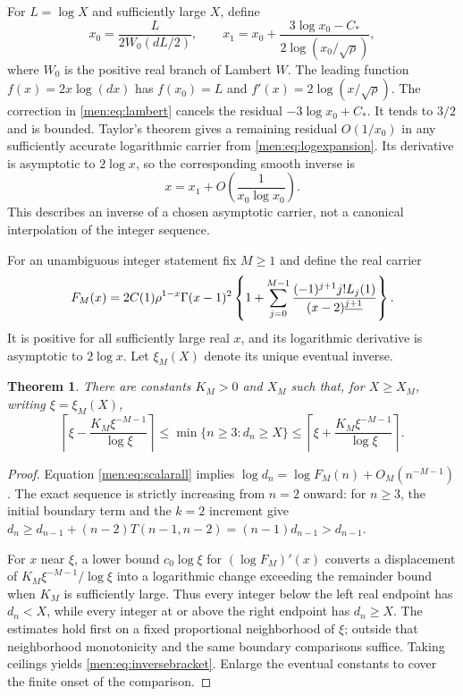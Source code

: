 \documentclass[11pt,letterpaper]{article}
\newtheorem{theorem}{Theorem}[section]
\theoremstyle{remark}\newtheorem{remark}[theorem]{Remark}
\begin{document}
For $L=\log X$ and sufficiently large $X$, define
\begin{equation}\label{men:eq:lambert}
 x_0=\frac{L}{2W_0(dL/2)},\qquad
 x_1=x_0+\frac{3\log x_0-C_*}{2\log(x_0/\sqrt\rho)},
\end{equation}
where $W_0$ is the positive real branch of Lambert $W$. The leading function $f(x)=2x\log(dx)$ has $f(x_0)=L$ and
$f'(x)=2\log(x/\sqrt\rho)$. The correction in \eqref{men:eq:lambert} cancels the residual $-3\log x_0+C_*$. It tends to $3/2$ and is bounded. Taylor's theorem gives a remaining residual $O(1/x_0)$ in any sufficiently accurate logarithmic carrier from \eqref{men:eq:logexpansion}. Its derivative is asymptotic to $2\log x$, so the corresponding smooth inverse is
\begin{equation}\label{men:eq:x1error}
 x=x_1+O\left(\frac1{x_0\log x_0}\right).
\end{equation}
This describes an inverse of a chosen asymptotic carrier, not a canonical interpolation of the integer sequence.

For an unambiguous integer statement fix $M\ge1$ and define the real carrier
\begin{equation}\label{men:eq:carrier}
 F_M(x)=2C(1)\rho^{1-x}\Gamma(x-1)^2
 \left\{1+\sum_{j=0}^{M-1}
  \frac{(-1)^{j+1}j!L_j(1)}{(x-2)^{\underline{j+1}}}\right\}.
\end{equation}
It is positive for all sufficiently large real $x$, and its logarithmic derivative is asymptotic to $2\log x$. Let $\xi_M(X)$ denote its unique eventual inverse.

\begin{theorem}\label{men:thm:inverse}
There are constants $K_M>0$ and $X_M$ such that, for $X\ge X_M$, writing $\xi=\xi_M(X)$,
\begin{equation}\label{men:eq:inversebracket}
 \left\lceil\xi-\frac{K_M\xi^{-M-1}}{\log\xi}\right\rceil
 \le \min\{n\ge3:d_n\ge X\}
 \le\left\lceil\xi+\frac{K_M\xi^{-M-1}}{\log\xi}\right\rceil.
\end{equation}
\end{theorem}
\begin{proof}
Equation \eqref{men:eq:scalarall} implies
$\log d_n=\log F_M(n)+O_M(n^{-M-1})$. The exact sequence is strictly increasing from $n=2$ onward: for $n\ge3$, the initial boundary term and the $k=2$ increment give
$d_n\ge d_{n-1}+(n-2)T(n-1,n-2)=(n-1)d_{n-1}>d_{n-1}$.

For $x$ near $\xi$, a lower bound $c_0\log\xi$ for $(\log F_M)'(x)$ converts a displacement of $K_M\xi^{-M-1}/\log\xi$ into a logarithmic change exceeding the remainder bound when $K_M$ is sufficiently large. Thus every integer below the left real endpoint has $d_n<X$, while every integer at or above the right endpoint has $d_n\ge X$. The estimates hold first on a fixed proportional neighborhood of $\xi$; outside that neighborhood monotonicity and the same boundary comparisons suffice. Taking ceilings yields \eqref{men:eq:inversebracket}. Enlarge the eventual constants to cover the finite onset of the comparison.
\end{proof}
\end{document}
